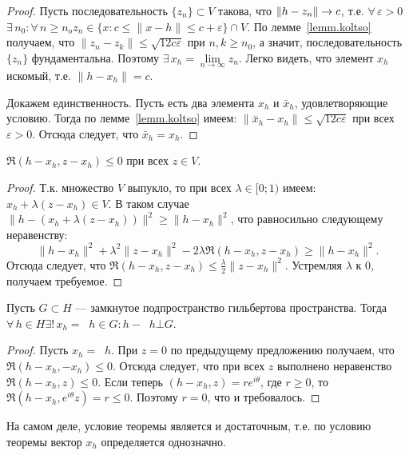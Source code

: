 \documentclass[10pt]{article}
\newcommand*{\p}[1]{#1\nobreak\discretionary{}{\hbox{$\mathsurround=0pt #1$}}{}}
\newcommand*{\pr}[1]{\mathop{\mathrm{pr_{#1}}}}
\begin{document}
\begin{proof}
Пусть последовательность $\{z_n\}\subset V$ такова, что
$\|h\p-z_n\|\to c$, т.е.
$\forall\,\varepsilon>0$\;\;$\exists\,n_0:\forall\,n\geqslant
n_o$\;\;$z_n\in\{x:c\leqslant\|x-h\|\leqslant c+\varepsilon\}\cap
V$. По лемме~\ref{lemm.koltso} получаем, что
$\|z_n-z_k\|\leqslant\sqrt{12c\varepsilon}$ при $n,k\geqslant n_0$,
а значит, последовательность $\{z_n\}$ фундаментальна. Поэтому
$\exists\,x_h=\lim\limits_{n\to\infty}z_n$. Легко видеть, что
элемент $x_h$ искомый, т.е. $\|h-x_h\|=c$.

Докажем единственность. Пусть есть два элемента $x_h$ и $\bar{x}_h$,
удовлетворяющие условию. Тогда по лемме~\ref{lemm.koltso} имеем:
$\|\bar{x}_h-x_h\|\leqslant\sqrt{12c\varepsilon}$ при всех
$\varepsilon>0$. Отсюда следует, что $\bar{x}_h=x_h$.
\end{proof}

\begin{prop}
$\Re(h-x_h,z-x_h)\leqslant 0$ при всех $z\in V$.
\end{prop}

\begin{proof}
Т.к. множество $V$ выпукло, то при всех $\lambda\in[0;1)$ имеем:
$x_h+\lambda(z-x_h)\in V$. В таком случае
$\|h-(x_h+\lambda(z-x_h))\|^2\geqslant\|h-x_h\|^2$, что равносильно
следующему неравенству:
$$\|h-x_h\|^2+\lambda^2\|z-x_h\|^2-2\lambda\Re(h-x_h,z-x_h)\geqslant \|h-x_h\|^2.$$
Отсюда следует, что $\Re(h-x_h,z-x_h)\leqslant\frac\lambda 2
\|z-x_h\|^2$. Устремляя $\lambda $ к 0, получаем требуемое.
\end{proof}

\begin{theorem}
Пусть $G\subset H$ --- замкнутое подпространство гильбертова
пространства. Тогда $\forall\,h\in H$\;\;$\exists!\,x_h=\pr{G}h\in
G:h-\pr{G}h\bot G$.
\end{theorem}

\begin{proof}
Пусть $x_h=\pr{G}h$. При $z=0$ по предыдущему предложению получаем,
что $\Re (h-x_h,-x_h)\leqslant 0$. Отсюда следует, что при всех $z$
выполнено неравенство $\Re(h-x_h,z)\leqslant 0$. Если теперь
$(h-x_h,z)=re^{i\theta}$, где $r\geqslant0$, то
$\Re(h-x_h,e^{i\theta}z)=r\leqslant0$. Поэтому $r=0$, что и
требовалось.
\end{proof}

\begin{note}
На самом деле, условие теоремы является и достаточным, т.е. по
условию теоремы вектор $x_h$ определяется однозначно.
\end{note}
\end{document}
